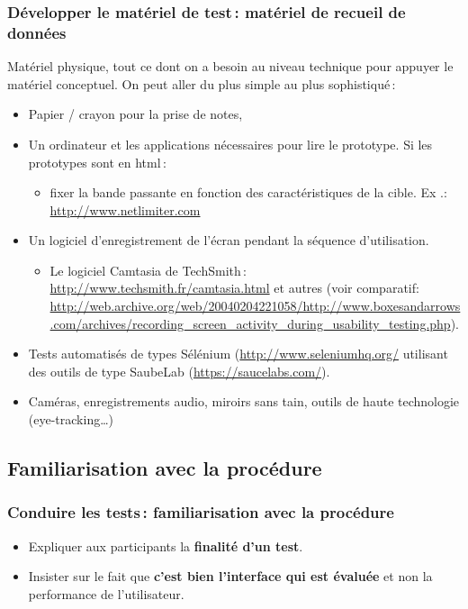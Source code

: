 		\begin{frame}[allowframebreaks]
		\frametitle{Développer le matériel de test\,: matériel de recueil de données  \citep{ergolab2014a}}
		 Matériel physique, tout ce dont on a besoin au niveau technique pour appuyer le matériel conceptuel.
		 On peut aller du plus simple au plus sophistiqué\,: 
			\begin {itemize}
				      \item Papier / crayon pour la prise de notes,
				      \item  Un ordinateur et les applications nécessaires pour lire le prototype. Si les prototypes sont en html\,:
				      		\begin {itemize}
				      		\item fixer la bande passante en fonction des caractéristiques de la cible. Ex .: \url{http://www.netlimiter.com}
						\end{itemize}
				      
				      \framebreak
				      \item Un logiciel d'enregistrement de l'écran pendant la séquence d'utilisation. 
				      		\begin {itemize}
				      		\item Le logiciel Camtasia de TechSmith\,: \url{http://www.techsmith.fr/camtasia.html} et autres (voir comparatif: \url{http://web.archive.org/web/20040204221058/http://www.boxesandarrows.com/archives/recording_screen_activity_during_usability_testing.php}). 
						\end{itemize}
				      \item Tests automatisés de types Sélénium (\url{http://www.seleniumhq.org/} utilisant des outils de type SaubeLab (\url{https://saucelabs.com/}).
				   	\item Caméras, enregistrements audio, miroirs sans tain, outils de haute technologie (eye-tracking…) 
			\end{itemize}
		\end{frame}   	
	
	
		\subsection{Familiarisation avec la procédure} 
		
		\begin{frame}[allowframebreaks]
		\frametitle{Conduire les tests\,: familiarisation avec la procédure \citep{ergolab2014a}}
					\begin {itemize}
				      \item Expliquer aux participants la \textbf{finalité d'un test}. 
				      \item Insister sur le fait que \textbf{c'est bien l'interface qui est évaluée} et non la performance de l'utilisateur.
					\end{itemize}
		\end{frame}   	
		
